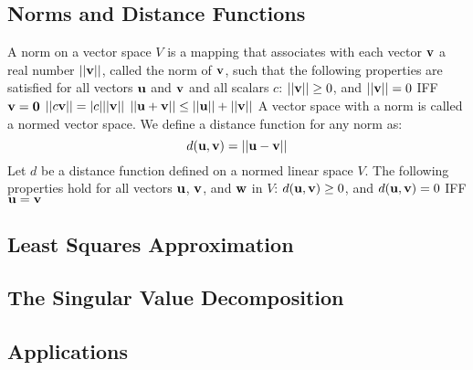 \documentclass{article}
\begin{document}
    \subsection{Norms and Distance Functions} 
    \begin{outline}
        \1 A norm on a vector space $V$ is a mapping that associates with each vector $\vb v$ a real number $||\vb v||$, called the norm of $\vb v$, such that the following properties are satisfied for all vectors $\vb u$ and $\vb v$ and all scalars $c$:
		\2 \(||\vb v||\geq 0\), and \(||\vb v||=0\) IFF \(\vb v=\vb 0\)
		\2 \(||c\vb v||=|c|||\vb v||\)
		\2 \(||\vb u+\vb v||\leq||\vb u||+||\vb v||\)
	\1 A vector space with a norm is called a normed vector space. 
	\1 We define a distance function for any norm as: \[d(\vb u,\vb v)=||\vb u-\vb v||\]
	\1 Let $d$ be a distance function defined on a normed linear space $V$. The following properties hold for all vectors $\vb u$, $\vb v$, and $\vb w$ in $V$:
		\2 \(d(\vb u,\vb v)\geq 0\), and \(d(\vb u,\vb v)=0\) IFF \(\vb u=\vb v\)
		\2 
    \end{outline}
    \subsection{Least Squares Approximation} 
    \begin{outline}
        \1 
    \end{outline}
    \subsection{The Singular Value Decomposition} 
    \begin{outline}
        \1 
    \end{outline}
    \subsection{Applications} 
    \begin{outline}
        \1 
    \end{outline}
    
\end{document}
